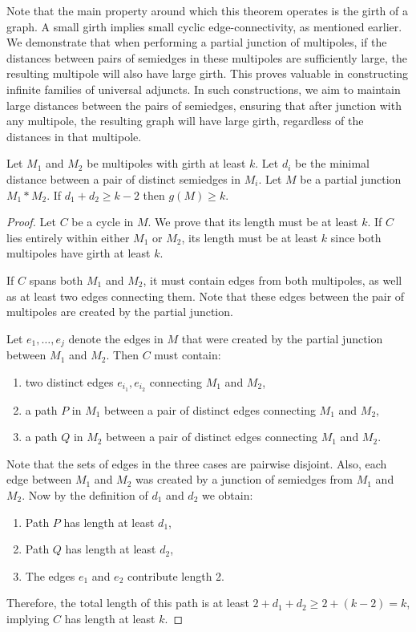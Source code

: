 \documentclass[12pt, twoside]{book}
\begin{document}
Note that the main property around which this theorem operates is the girth of a graph. A small girth implies small cyclic edge-connectivity, as mentioned earlier. We demonstrate that when performing a partial junction of multipoles, if the distances between pairs of semiedges in these multipoles are sufficiently large, the resulting multipole will also have large girth. This proves valuable in constructing infinite families of universal adjuncts. In such constructions, we aim to maintain large distances between the pairs of semiedges, ensuring that after junction with any multipole, the resulting graph will have large girth, regardless of the distances in that multipole.

\begin{lemma}\label{lem:cyclic-multipoles-with-girth-and-distance}
	Let $M_1$ and $M_2$ be multipoles with girth at least $k$. Let $d_i$ be the minimal distance between a pair of distinct semiedges in $M_i$. Let $M$ be a partial junction $M_1*M_2$. If $d_1+d_2\geq k-2$ then $g(M)\geq k$.
\end{lemma}

\begin{proof}
	Let $C$ be a cycle in $M$. We prove that its length must be at least $k$. If $C$ lies entirely within either $M_1$ or $M_2$, its length must be at least $k$ since both multipoles have girth at least $k$.
	
	If $C$ spans both $M_1$ and $M_2$, it must contain edges from both multipoles, as well as at least two edges connecting them. Note that these edges between the pair of multipoles are created by the partial junction.
	
	Let $e_1,\dots,e_j$ denote the edges in $M$ that were created by the partial junction between $M_1$ and $M_2$. Then $C$ must contain:
	\begin{enumerate}[label=(\roman*)]
		\item two distinct edges $e_{i_1},e_{i_2}$ connecting $M_1$ and $M_2$,
		\item a path $P$ in $M_1$ between a pair of distinct edges connecting $M_1$ and $M_2$,
		\item a path $Q$ in $M_2$ between a pair of distinct edges connecting $M_1$ and $M_2$.
	\end{enumerate}
	Note that the sets of edges in the three cases are pairwise disjoint. Also, each edge between $M_1$ and $M_2$ was created by a junction of semiedges from $M_1$ and $M_2$. Now by the definition of $d_1$ and $d_2$ we obtain:
	
	\begin{enumerate}[label=(\roman*)]
		\item Path $P$ has length at least $d_1$,
		\item Path $Q$ has length at least $d_2$,
		\item The edges $e_1$ and $e_2$ contribute length 2.
	\end{enumerate}
	
	Therefore, the total length of this path is at least $2+d_1+d_2 \geq 2+(k-2) = k$, implying $C$ has length at least $k$.
\end{proof}
\end{document}
